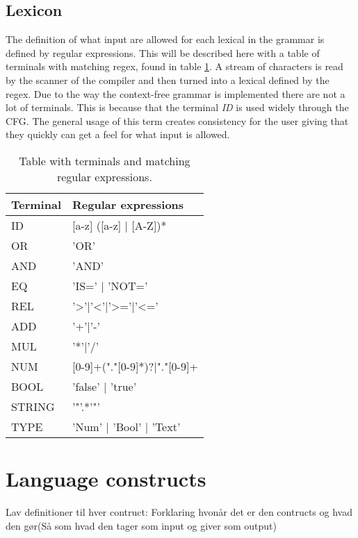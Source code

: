 \subsection{Lexicon}
The definition of what input are allowed for each lexical in the grammar is defined by regular expressions. This will be described here with a table of terminals with matching regex, found in table \ref{fig:Lexicon}. A stream of characters is read by the scanner of the compiler and then turned into a lexical defined by the regex.
Due to the way the context-free grammar is implemented there are not a lot of terminals. This is because that the terminal \emph{ID} is used widely through the CFG. The general usage of this term creates consistency for the user giving that they quickly can get a feel for what input is allowed. 

\begin{table}[]
\centering
\begin{tabular}{|l|l|}
\hline
Terminal & Regular expressions                \\ \hline
ID       & {[}a-z{]} ({[}a-z{]} | {[}A-Z{]})* \\ \hline
OR		 & 'OR'								  \\ \hline
AND		 & 'AND'							  \\ \hline
EQ		 & 'IS=' | 'NOT='					  \\ \hline
REL		 & '>'|'<'|'>='|'<='					  \\ \hline
ADD		 & '+'|'-'							  \\ \hline
MUL		 & '*'|'/'							  \\ \hline
NUM		 & [0-9]+("."[0-9]*)?|"."[0-9]+\\ \hline
BOOL 	 & 'false' | 'true'					  \\ \hline
STRING 	 & '"'.*'"'						      \\ \hline
TYPE     & 'Num' | 'Bool' | 'Text'            \\ \hline


\end{tabular}
\caption{Table with terminals and matching regular expressions.}
\label{fig:Lexicon}
\end{table}

\section{Language constructs}
Lav definitioner til hver contruct:
Forklaring hvonår det er den contructs og hvad den gør(Så som hvad den tager som input og giver som output)

